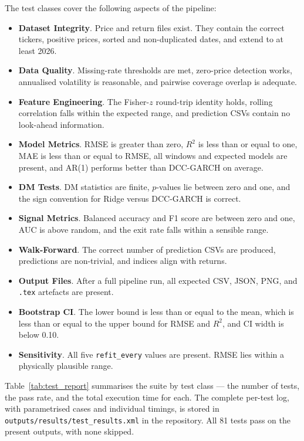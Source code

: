 The test classes cover the following aspects of the pipeline:
\begin{itemize}
    \item \textbf{Dataset Integrity}. Price and return files exist. They contain the correct tickers, positive prices, sorted and non-duplicated dates, and extend to at least 2026.
    \item \textbf{Data Quality}. Missing-rate thresholds are met, zero-price detection works, annualised volatility is reasonable, and pairwise coverage overlap is adequate.
    \item \textbf{Feature Engineering}. The Fisher-$z$ round-trip identity holds, rolling correlation falls within the expected range, and prediction CSVs contain no look-ahead information.
    \item \textbf{Model Metrics}. RMSE is greater than zero, $R^2$ is less than or equal to one, MAE is less than or equal to RMSE, all windows and expected models are present, and AR(1) performs better than DCC-GARCH on average.
    \item \textbf{DM Tests}. DM statistics are finite, $p$-values lie between zero and one, and the sign convention for Ridge versus DCC-GARCH is correct.
    \item \textbf{Signal Metrics}. Balanced accuracy and F1 score are between zero and one, AUC is above random, and the exit rate falls within a sensible range.
    \item \textbf{Walk-Forward}. The correct number of prediction CSVs are produced, predictions are non-trivial, and indices align with returns.
    \item \textbf{Output Files}. After a full pipeline run, all expected CSV, JSON, PNG, and \texttt{.tex} artefacts are present.
    \item \textbf{Bootstrap CI}. The lower bound is less than or equal to the mean, which is less than or equal to the upper bound for RMSE and $R^2$, and CI width is below 0.10.
    \item \textbf{Sensitivity}. All five \texttt{refit\_every} values are present. RMSE lies within a physically plausible range.
\end{itemize}

Table~\ref{tab:test_report} summarises the suite by test class --- the number of
tests, the pass rate, and the total execution time for each. The complete
per-test log, with parametrised cases and individual timings, is stored in
\texttt{outputs/results/test\_results.xml} in the repository. All 81 tests pass
on the present outputs, with none skipped.



\clearpage
